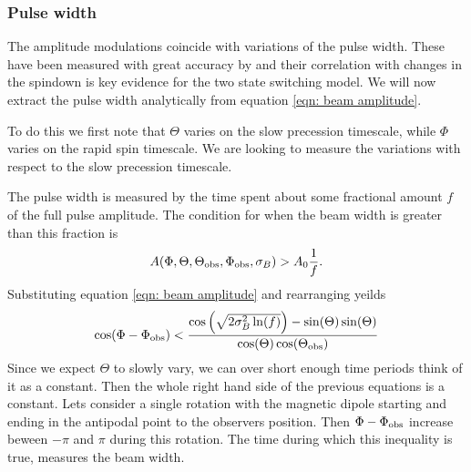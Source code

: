 \documentclass[/home/greg/Thesis/main/main.tex]{subfiles}
\begin{document}
\FloatBarrier
\subsubsection{Pulse width}
The amplitude modulations coincide with variations of the pulse width.
These have been measured with great accuracy by \citet{Lyne2010} and their
correlation with changes in the spindown is key evidence for the two
state switching model. We  will now extract the pulse width analytically from
equation \eqref{eqn: beam amplitude}.

To do this we first note that $\Theta$ varies on the slow
precession timescale, while $\Phi$ varies on the rapid spin timescale. We are
looking to measure the variations with respect to the slow precession timescale.

The pulse width is measured by the time spent about some fractional amount $f$
of the full pulse amplitude. The condition for when the beam width is greater
than this fraction is
\begin{align}
A(\Phi, \Theta, \Theta_{\mathrm{obs}}, \Phi_{\mathrm{obs}}, \sigma_{B}) > A_{0} \frac{1}{f}.
\end{align}
Substituting equation \eqref{eqn: beam amplitude} and rearranging yeilds
\begin{equation}
\cos(\Phi - \Phi_{\mathrm{obs}}) < \frac{\cos\left(\sqrt{2\sigma_{B}^{2} \ln(f)}\right) - \sin(\Theta)\sin(\Theta)}
                          {\cos(\Theta)\cos(\Theta_{\mathrm{obs}})}
\label{eqn: 6737}
\end{equation}
Since we expect $\Theta$ to slowly vary, we can over short enough time periods
think of it as a constant. Then the whole right hand side of the previous
equations is a constant. Lets consider a single rotation with the magnetic dipole
starting and ending in the antipodal point to the observers position. Then 
$\Phi - \Phi_{\mathrm{obs}}$ increase beween $-\pi$ and $\pi$ during this rotation. The
time during which this inequality is true, measures the beam width.
\end{document}
